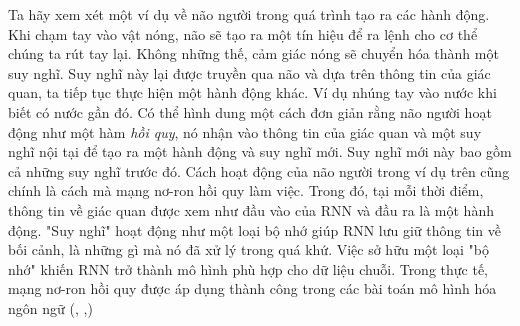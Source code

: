 Ta hãy xem xét một ví dụ về não người trong quá trình tạo ra các hành động. Khi chạm tay vào vật nóng, não sẽ tạo ra một tín hiệu để ra lệnh cho cơ thể chúng ta rút tay lại. Không những thế, cảm giác nóng sẽ chuyển hóa thành một suy nghĩ. Suy nghĩ này lại được truyền qua não và dựa trên thông tin của giác quan, ta tiếp tục thực hiện một hành động khác. Ví dụ nhúng tay vào nước khi biết có nước gần đó. Có thể hình dung một cách đơn giản rằng não người hoạt động như một hàm \textit{hồi quy}, nó nhận vào thông tin của giác quan và một suy nghĩ nội tại để tạo ra một hành động và suy nghĩ mới. Suy nghĩ mới này bao gồm cả những suy nghĩ trước đó. Cách hoạt động của não người trong ví dụ trên cũng chính là cách mà mạng nơ-ron hồi quy làm việc. Trong đó, tại mỗi thời điểm, thông tin về giác quan được xem như đầu vào của RNN và đầu ra là một hành động. "Suy nghĩ" hoạt động như một loại bộ nhớ giúp RNN lưu giữ thông tin về bối cảnh, là những gì mà nó đã xử lý trong quá khứ. Việc sở hữu một loại "bộ nhớ" khiến RNN trở thành mô hình phù hợp cho dữ liệu chuỗi. Trong thực tế, mạng nơ-ron hồi quy được áp dụng thành công trong các bài toán mô hình hóa ngôn ngữ (\cite{languagemodelingMikolov1}, \cite{languagemodelingMikolov2},\cite{languagemodelingMikolov3})



